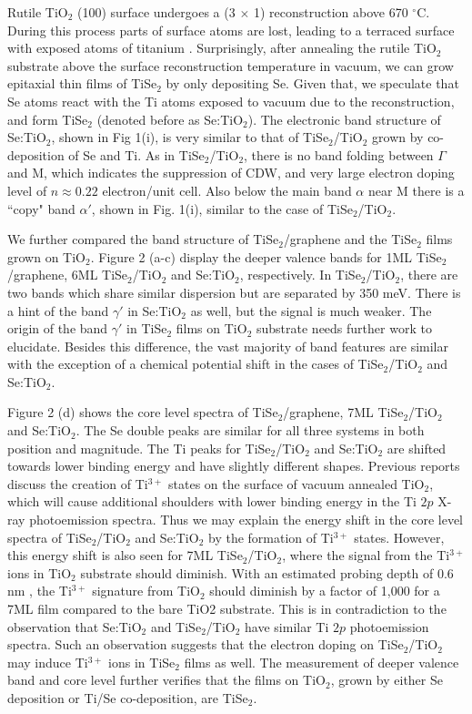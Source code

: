 \documentclass[journal=nalefd,manuscript=letter]{achemso}
\begin{document}
Rutile TiO$_2$ (100) surface undergoes a (3 $\times$ 1) reconstruction above 670 $^\circ$C. During this process parts of surface atoms are lost, leading to a terraced surface with exposed atoms of titanium \cite{DieboldTiO2}.
Surprisingly, after annealing the rutile TiO$_2$ substrate above the surface reconstruction temperature in vacuum, we can grow epitaxial thin films of TiSe$_2$ by only depositing Se.
Given that, we speculate that Se atoms react with the Ti atoms exposed to vacuum due to the reconstruction, and form TiSe$_2$ (denoted before as Se:TiO$_2$).
The electronic band structure of Se:TiO$_2$, shown in Fig 1(i), is very similar to that of TiSe$_2$/TiO$_2$ grown by co-deposition of Se and Ti.
As in TiSe$_2$/TiO$_2$, there is no band folding between $\Gamma$ and M, which indicates the suppression of CDW, and very large electron doping level of $n\approx 0.22$ electron/unit cell.
Also below the main band $\alpha$ near M there is a ``copy" band $\alpha'$, shown in Fig. 1(i), similar to the case of TiSe$_2$/TiO$_2$.

We further compared the band structure of TiSe$_2$/graphene and the TiSe$_2$ films grown on TiO$_2$.
Figure 2 (a-c) display the deeper valence bands for 1ML TiSe$_2$/graphene, 6ML TiSe$_2$/TiO$_2$ and Se:TiO$_2$, respectively.
In TiSe$_2$/TiO$_2$, there are two bands which share similar dispersion but are separated by 350 meV.
There is a hint of the band $\gamma'$ in Se:TiO$_2$ as well, but the signal is much weaker.
The origin of the band $\gamma'$ in TiSe$_2$ films on TiO$_2$ substrate needs further work to elucidate.
Besides this difference, the vast majority of band features are similar with the exception of a chemical potential shift in the cases of TiSe$_2$/TiO$_2$ and Se:TiO$_2$.

Figure 2 (d) shows the core level spectra of TiSe$_2$/graphene, 7ML TiSe$_2$/TiO$_2$ and Se:TiO$_2$.
The Se double peaks are similar for all three systems in both position and magnitude.
The Ti peaks for TiSe$_2$/TiO$_2$ and Se:TiO$_2$ are shifted towards lower binding energy and have slightly different shapes. 
Previous reports discuss the creation of Ti$^{3+}$ states on the surface of vacuum annealed TiO$_2$\cite{TiO23p}, which will cause additional shoulders with lower binding energy in the Ti $2p$ X-ray photoemission spectra.
Thus we may explain the energy shift in the core level spectra of TiSe$_2$/TiO$_2$ and Se:TiO$_2$ by the formation of Ti$^{3+}$ states.
However, this energy shift is also seen for 7ML TiSe$_2$/TiO$_2$, where the signal from the Ti$^{3+}$ ions in TiO$_2$ substrate should diminish.
With an estimated probing depth of 0.6 nm \cite{LINDAU1974}, the Ti$^{3+}$ signature from TiO$_2$ should diminish by a factor of 1,000 for a 7ML film compared to the bare TiO2 substrate.
This is in contradiction to the observation that Se:TiO$_2$ and TiSe$_2$/TiO$_2$ have similar Ti $2p$ photoemission spectra.
Such an observation suggests that the electron doping on TiSe$_2$/TiO$_2$ may induce Ti$^{3+}$ ions in TiSe$_2$ films as well.
The measurement of deeper valence band and core level further verifies that the films on TiO$_2$, grown by either Se deposition or Ti/Se co-deposition, are TiSe$_2$.
\end{document}
